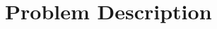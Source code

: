\documentclass{article}
\newcommand{\ph}[1]{{\textbf{#1}:}} %
\begin{document}







\section{Problem Description}
\end{document}

